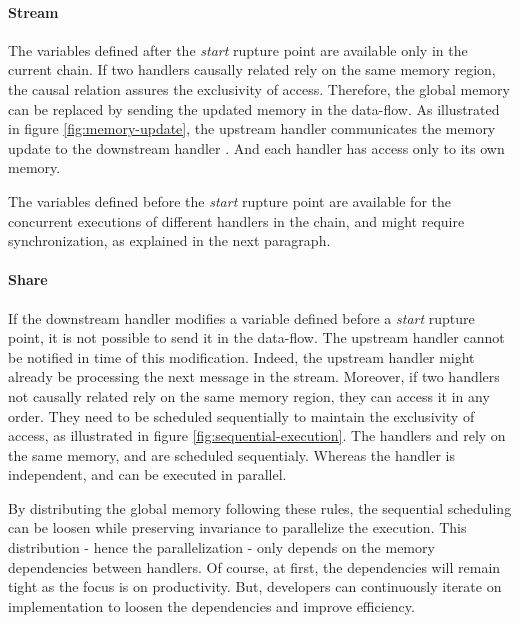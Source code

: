 \paragraph{Stream}
The variables defined after the \textit{start} rupture point are available only in the current chain.
If two handlers causally related rely on the same memory region, the causal relation assures the exclusivity of access. Therefore, the global memory can be replaced by sending the updated memory in the data-flow.
As illustrated in figure \ref{fig:memory-update}, the upstream handler  communicates the memory update to the downstream handler .
And each handler has access only to its own memory.

The variables defined before the \textit{start} rupture point are available for the concurrent executions of different handlers in the chain, and might require synchronization, as explained in the next paragraph.

\paragraph{Share}
If the downstream handler modifies a variable defined before a \textit{start} rupture point, it is not possible to send it in the data-flow.
The upstream handler cannot be notified in time of this modification.
Indeed, the upstream handler might already be processing the next message in the stream.
Moreover, if two handlers not causally related rely on the same memory region, they can access it in any order.
They need to be scheduled sequentially to maintain the exclusivity of access, as illustrated in figure \ref{fig:sequential-execution}.
The handlers  and  rely on the same memory, and are scheduled sequentialy.
Whereas the handler  is independent, and can be executed in parallel.


\separator

By distributing the global memory following these rules, the sequential scheduling can be loosen while preserving invariance to parallelize the execution.
This distribution - hence the parallelization - only depends on the memory dependencies between handlers.
Of course, at first, the dependencies will remain tight as the focus is on productivity.
But, developers can continuously iterate on implementation to loosen the dependencies and improve efficiency.

